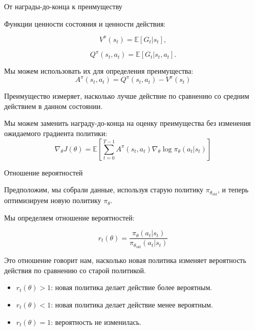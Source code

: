 \documentclass{beamer}
\begin{document}
	\begin{frame}{От награды-до-конца к преимуществу}
		\begin{flushleft}
			
			Функции ценности состояния и ценности действия:
			
			\[
			V^\pi(s_t)=\mathbb{E}[G_t|s_t],
			\]
			
			\[
			Q^\pi(s_t,a_t)=\mathbb{E}[G_t|s_t,a_t].
			\]
			
			Мы можем использовать их для определения преимущества:
			\[
			\boxed{
				A^\pi(s_t,a_t)
				=
				Q^\pi(s_t,a_t)-V^\pi(s_t)
			}
			\]
			
			Преимущество измеряет, насколько лучше действие
			по сравнению со средним действием в данном состоянии.
			
			Мы можем заменить награду-до-конца на оценку преимущества
			без изменения ожидаемого градиента политики:
			\[
			\boxed{
				\nabla_\theta J(\theta)
				=
				\mathbb{E}
				\left[
				\sum_{t=0}^{T-1}
				A^\pi(s_t,a_t)
				\nabla_\theta\log\pi_\theta(a_t|s_t)
				\right]
			}
			\]
			
		\end{flushleft}
	\end{frame}
	
	\begin{frame}{Отношение вероятностей}
		\begin{flushleft}
			
			Предположим, мы собрали данные, используя старую политику
			$\pi_{\theta_{\mathrm{old}}}$, и теперь оптимизируем
			новую политику $\pi_\theta$.
			
			Мы определяем отношение вероятностей:
			
			\[
			\boxed{
				r_t(\theta)
				=
				\frac{
					\pi_\theta(a_t|s_t)
				}{
					\pi_{\theta_{\mathrm{old}}}(a_t|s_t)
				}
			}
			\]
			
			Это отношение говорит нам, насколько новая политика изменяет
			вероятность действия по сравнению со старой политикой.
			
			\begin{itemize}
				\item $r_t(\theta)>1$: новая политика делает действие
				более вероятным.
				\item $r_t(\theta)<1$: новая политика делает действие
				менее вероятным.
				\item $r_t(\theta)=1$: вероятность не изменилась.
			\end{itemize}
			
		\end{flushleft}
	\end{frame}
	
\end{document}

